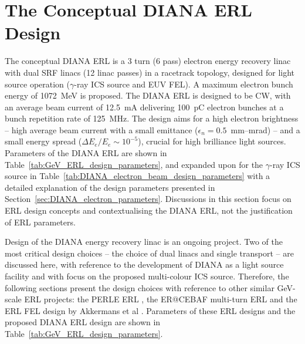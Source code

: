 \documentclass[../main.tex]{subfiles}
\begin{document}
\section{The Conceptual DIANA ERL Design}
\label{sec:DIANA_ERL_design}

The conceptual DIANA ERL is a 3 turn (6 pass) electron energy recovery linac with dual SRF linacs (12 linac passes) in a racetrack topology, designed for light source operation ($\gamma$-ray ICS source and EUV FEL). A maximum electron bunch energy of 1072~\si{\mega\electronvolt} is proposed. The DIANA ERL is designed to be CW, with an average beam current of 12.5~\si{\milli\ampere} delivering 100~\si{\pico\coulomb} electron bunches at a bunch repetition rate of 125~\si{\mega\hertz}. The design aims for a high electron brightness -- high average beam current with a small emittance ($\epsilon_{n}=0.5$~\si{\milli\meter}--\si{\milli\radian}) -- and a small energy spread ($\Delta E_{e}/E_{e} \sim 10^{-5}$), crucial for high brilliance light sources. Parameters of the DIANA ERL are shown in Table~\ref{tab:GeV_ERL_design_parameters}, and expanded upon for the $\gamma$-ray ICS source in Table~\ref{tab:DIANA_electron_beam_design_parameters} with a detailed explanation of the design parameters presented in Section~\ref{sec:DIANA_electron_parameters}. Discussions in this section focus on ERL design concepts and contextualising the DIANA ERL, not the justification of ERL parameters. 

Design of the DIANA energy recovery linac is an ongoing project. Two of the most critical design choices -- the choice of dual linacs and single transport -- are discussed here, with reference to the development of DIANA as a light source facility and with focus on the proposed multi-colour ICS source. Therefore, the following sections present the design choices with reference to other similar \si{\giga\electronvolt}-scale ERL projects: the PERLE ERL \cite{angal2018perle}, the ER@CEBAF multi-turn ERL \cite{meot2016er} and the ERL FEL design by Akkermans et al \cite{akkermans2017compact}. Parameters of these ERL designs and the proposed DIANA ERL design are shown in Table~\ref{tab:GeV_ERL_design_parameters}.
\end{document}
